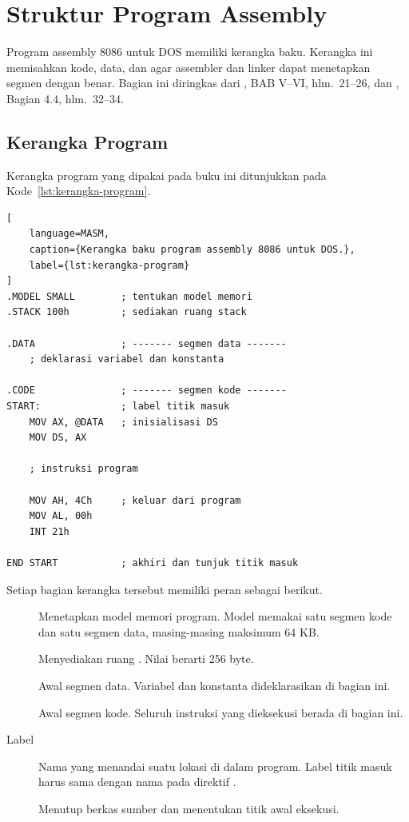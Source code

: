 \section{Struktur Program Assembly}
\label{sec:struktur-program}

Program assembly 8086 untuk DOS memiliki kerangka baku. Kerangka ini
memisahkan kode, data, dan  agar assembler dan linker
dapat menetapkan segmen dengan benar. Bagian ini diringkas dari
\cite{sto2001}, BAB V--VI, hlm.~21--26, dan \cite{gunawan2019},
Bagian 4.4, hlm.~32--34.

\subsection{Kerangka Program}

Kerangka program  yang dipakai pada buku ini ditunjukkan
pada Kode~\ref{lst:kerangka-program}.

\begin{lstlisting}[
    language=MASM,
    caption={Kerangka baku program assembly 8086 untuk DOS.},
    label={lst:kerangka-program}
]
.MODEL SMALL        ; tentukan model memori
.STACK 100h         ; sediakan ruang stack

.DATA               ; ------- segmen data -------
    ; deklarasi variabel dan konstanta

.CODE               ; ------- segmen kode -------
START:              ; label titik masuk
    MOV AX, @DATA   ; inisialisasi DS
    MOV DS, AX

    ; instruksi program

    MOV AH, 4Ch     ; keluar dari program
    MOV AL, 00h
    INT 21h

END START           ; akhiri dan tunjuk titik masuk
\end{lstlisting}

Setiap bagian kerangka tersebut memiliki peran sebagai berikut.

\begin{description}
    \item[] Menetapkan model memori program. Model
           memakai satu segmen kode dan satu segmen data,
          masing-masing maksimum 64 KB.

    \item[] Menyediakan ruang . Nilai
           berarti 256 byte.

    \item[] Awal segmen data. Variabel dan konstanta
          dideklarasikan di bagian ini.

    \item[] Awal segmen kode. Seluruh instruksi yang
          dieksekusi berada di bagian ini.

    \item[Label] Nama yang menandai suatu lokasi di dalam program.
          Label titik masuk harus sama dengan nama pada direktif
          .

    \item[] Menutup berkas sumber dan menentukan titik awal
          eksekusi.
\end{description}

